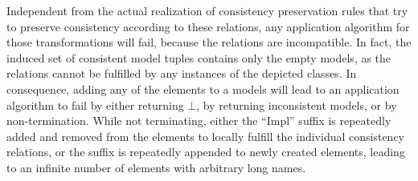 Independent from the actual realization of consistency preservation rules that try to preserve consistency according to these relations, any application algorithm for those transformations will fail, because the relations are incompatible.
In fact, the induced set of consistent model tuples contains only the empty models, as the relations cannot be fulfilled by any instances of the depicted classes.
In consequence, adding any of the elements to a models will lead to an application algorithm to fail by either returning $\bot$, by returning inconsistent models, or by non-termination.
While not terminating, either the \enquote{Impl} suffix is repeatedly added and removed from the elements to locally fulfill the individual consistency relations, or the suffix is repeatedly appended to newly created elements, leading to an infinite number of elements with arbitrary long names.

